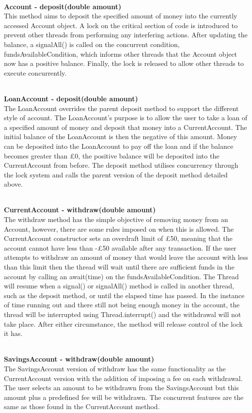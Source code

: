 \documentclass[a4paper,12pt]{article}
\begin{document}
\textbf{\\Account - deposit(double amount)}
\\This method aims to deposit the specified amount of money into the currently accessed Account object. A lock on the critical section of code is introduced to prevent other threads from performing any interfering actions. After updating the balance, a signalAll() is called on the  concurrent condition, fundsAvailableCondition, which informs other threads that the Account object now has a positive balance. Finally, the lock is released to allow other threads to execute concurrently.

\textbf{\\LoanAccount - deposit(double amount)}
\\The LoanAccount overrides the parent deposit method to support the different style of account. The LoanAccount's purpose is to allow the user to take a loan of a specified amount of money and deposit that money into a CurrentAccount. The initial balance of the LoanAccount is then the negative of this amount. Money can be deposited into the LoanAccount to pay off the loan and if the balance becomes greater than £0, the positive balance will be deposited into the CurrentAccount from before. The deposit method utilises concurrency through the lock system and calls the parent version of the deposit method detailed above.  


\textbf{\\CurrentAccount - withdraw(double amount)}
\\The withdraw method has the simple objective of removing money from an Account, however, there are some rules imposed on when this is allowed. The CurrentAccount constructor sets an overdraft limit of £50, meaning that the account cannot have less than -£50 available after any transaction. If the user attempts to withdraw an amount of money that would leave the account with less than this limit then the thread will wait until there are sufficient funds in the account by calling an await(time) on the fundsAvailableCondition. The Thread will resume when a signal() or signalAll() method is called in another thread, such as the deposit method, or until the elapsed time has passed. In the instance of time running out and there still not being enough money in the account, the thread will be interrupted using Thread.interrupt() and the withdrawal will not take place. After either circumstance, the method will release control of the lock it has.


\textbf{\\SavingsAccount - withdraw(double amount)}
\\The SavingsAccount version of withdraw has the same functionality as the CurrentAccount version with the addition of imposing a fee on each withdrawal. The user selects an amount to be withdrawn from the SavingsAccount but this amount plus a predefined fee will be withdrawn. The concurrent features are the same as those found in the CurrentAccount method.
\end{document}
